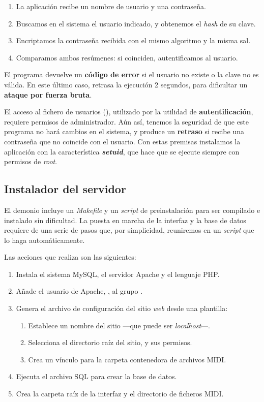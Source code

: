 \begin{enumerate}
	\item La aplicación recibe un nombre de usuario y una contraseña.
	\item Buscamos en el sistema el usuario indicado, y obtenemos el \textit{hash} de su clave.
	\item Encriptamos la contraseña recibida con el mismo algoritmo y la misma sal.
	\item Comparamos ambos resúmenes: si coinciden, autentificamos al usuario.
\end{enumerate}

El programa devuelve un \textbf{código de error} si el usuario no existe o la clave no es válida. En este último caso, retrasa la ejecución 2 segundos, para dificultar un \textbf{ataque por fuerza bruta}.

El acceso al fichero de usuarios (), utilizado por la utilidad de \textbf{autentificación}, requiere permisos de administrador. Aún así, tenemos la seguridad de que este programa no hará cambios en el sistema, y produce un \textbf{retraso} si recibe una contraseña que no coincide con el usuario. Con estas premisas instalamos la aplicación con la característica \textbf{\textit{setuid}}, que hace que se ejecute siempre con permisos de \textit{root}.

\subsection{Instalador del servidor}

El demonio incluye un \textit{Makefile} y un \textit{script} de preinstalación para ser compilado e instalado sin dificultad. La puesta en marcha de la interfaz y la base de datos requiere de una serie de pasos que, por simplicidad, reuniremos en un \textit{script} que lo haga automáticamente.

Las acciones que realiza son las siguientes:

\begin{enumerate}
	\item Instala el sistema MySQL, el servidor Apache y el lenguaje PHP.
	\item Añade el usuario de Apache, , al grupo .
	\item Genera el archivo de configuración del sitio \textit{web} desde una plantilla:
	
	\begin{enumerate}
		\item Establece un nombre del sitio ---que puede ser \textit{localhost}---.
		\item Selecciona el directorio raíz del sitio, y sus permisos.
		\item Crea un vínculo para la carpeta contenedora de archivos \acrshort{MIDI}.
	\end{enumerate}
	
	\item Ejecuta el archivo \acrshort{SQL} para crear la base de datos.
	\item Crea la carpeta raíz de la interfaz y el directorio de ficheros \acrshort{MIDI}.
\end{enumerate}

